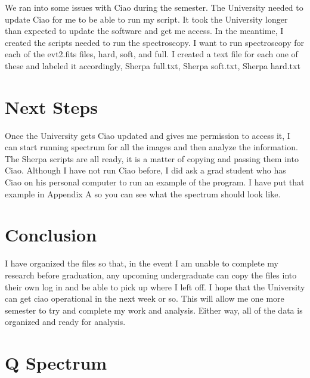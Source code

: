 \documentclass[12pt]{report}
\begin{document}
We ran into some issues with Ciao during the semester. The University needed to update Ciao for me to be able to run my script. It took the University longer than expected to update the software and get me access. In the meantime, I created the scripts needed to run the spectroscopy. I want to run spectroscopy for each of the evt2.fits files, hard, soft, and full. I created a text file for each one of these and labeled it accordingly, Sherpa \textunderscore full.txt, Sherpa \textunderscore soft.txt, Sherpa \textunderscore hard.txt

\chapter{Next Steps}
Once the University gets Ciao updated and gives me permission to access it, I can start running spectrum for all the images and then analyze the information. The Sherpa scripts are all ready, it is a matter of copying and passing them into Ciao. Although I have not run Ciao before, I did ask a grad student who has Ciao on his personal computer to run an example of the program. I have put that example in Appendix A so you can see what the spectrum should look like.
\chapter{Conclusion}
I have organized the files so that, in the event I am unable to complete my research before graduation, any upcoming undergraduate can copy the files into their own log in and be able to pick up where I left off. I hope that the University can get ciao operational in the next week or so. This will allow me one more semester to try and complete my work and analysis. Either way, all of the data is organized and ready for analysis.

\appendix
\chapter{Q  Spectrum}
\end{document}
